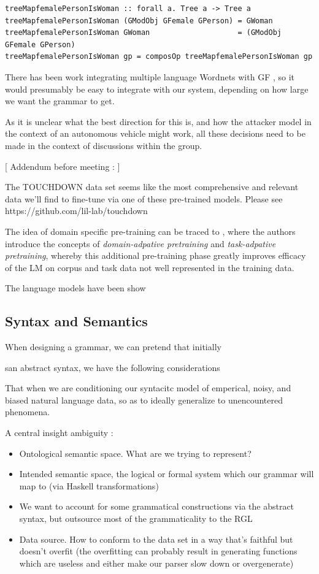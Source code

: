 \documentclass{article}
\begin{document}
\begin{verbatim}
treeMapfemalePersonIsWoman :: forall a. Tree a -> Tree a
treeMapfemalePersonIsWoman (GModObj GFemale GPerson) = GWoman
treeMapfemalePersonIsWoman GWoman                    = (GModObj GFemale GPerson)
treeMapfemalePersonIsWoman gp = composOp treeMapfemalePersonIsWoman gp
\end{verbatim}

There has been work integrating multiple language Wordnets with GF
\cite{virk2014developing}, so it would presumably be easy to integrate with our
system, depending on how large we want the grammar to get.


As it is unclear what the best direction for this is, and how the attacker model
in the context of an autonomous vehicle might work, all these decisions need to
be made in the context of discussions within the group.

[ Addendum before meeting : ]

The TOUCHDOWN data set \cite{chen2019touchdown} seems like the most
comprehensive and relevant data we'll find to fine-tune via one of these
pre-trained models. Please see https://github.com/lil-lab/touchdown


The idea of domain specific pre-training can be traced to
\cite{gururangan-etal-2020-dont}, where the authors introduce the concepts of
\emph{domain-adpative pretraining} and \emph{task-adpative pretraining}, whereby
this additional pre-training phase greatly improves efficacy of the LM on
corpus and task data not well represented in the training data.

The language models have been show \cite{bioBert}


\subsection{Syntax and Semantics}

When designing a grammar, we can pretend that initially

san abstract syntax, we have the following considerations

That when we are conditioning our syntacitc model of emperical, noisy, and
biased natural language data, so as to ideally generalize to unencountered
phenomena.

A central insight ambiguity :


\begin{itemize}
\item Ontological semantic space. What are we trying to represent?
\item Intended semantic space, the logical or formal system which our grammar
  will map to (via Haskell transformations)
\item  We want to account for some grammatical constructions via the abstract syntax, but
  outsource most of the grammaticality to the RGL
\item Data source. How to conform to the data set in a way that's faithful but
  doesn't overfit (the overfitting can probably result in generating functions
  which are useless and either make our parser slow down or overgenerate)
\end{itemize}
\end{document}
